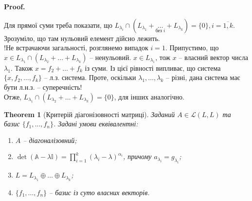 \documentclass[a4paper, 10pt]{article}
\makeatletter
\theoremstyle{theoremdd}
\newtheorem{theorem}{Theorem}[subsection]
\renewenvironment{proof}[1][Proof.\\]{\par
\pushQED{\hfill \qed}%
\normalfont \topsep6\p@\@plus6\p@\relax
\trivlist
\item\relax
{\bfseries
#1\@addpunct{.}}\hspace\labelsep\ignorespaces
}{%
\popQED\endtrivlist\@endpefalse
}
\makeatother
\begin{document}
\begin{proof}
Для прямої суми треба показати, що $L_{\lambda_i} \cap \left( L_{\lambda_1} + \underset{\text{без }i}{\dots} + L_{\lambda_k} \right) = \{0\}, i = \overline{1,k}$. Зрозуміло, що там нульовий елемент дійсно лежить.\\
!Не встрачаючи загальності, розглянемо випадок $i = 1$. Припустимо, що $x \in L_{\lambda_1} \cap (L_{\lambda_2} + \dots + L_{\lambda_k})$ -- ненульовий. $x \in L_{\lambda_1}$, тож $x$ -- власний вектор числа $\lambda_1$. Також $x = f_2 + \dots + f_k$ із суми. Із цієї рівності випливає, що система $\{x,f_2,\dots,f_k\}$ -- л.з. система. Проте, оскільки $\lambda_1,\dots,\lambda_k$ -- різні, дана система має бути л.н.з. -- суперечність!\\
Отже, $L_{\lambda_1} \cap (L_{\lambda_2} + \dots + L_{\lambda_k}) = \{0\}$, для інших аналогічно.
\end{proof}

\begin{theorem}[Критерій діагонізовності матриці]
Заданий $A \in \mathcal{L}(L,L)$ та базис $\{f_1,\dots,f_n\}$. Задані умови еквівалентні:
\begin{enumerate}[nosep,wide=0pt,label={\arabic*)}]
\item $A$ -- діагоналізовний;
\item $\det (\mathbb{A}-\lambda \mathbb{I}) = \displaystyle\prod_{i=1}^k (\lambda_i - \lambda)^{\alpha_i}$, причому $a_{\lambda_i} = g_{\lambda_i}$;
\item $L = L_{\lambda_1} \oplus \dots \oplus L_{\lambda_k}$;
\item $\{f_1,\dots,f_n\}$ -- базис із суто власних векторів.
\end{enumerate}
\end{theorem}
\end{document}
